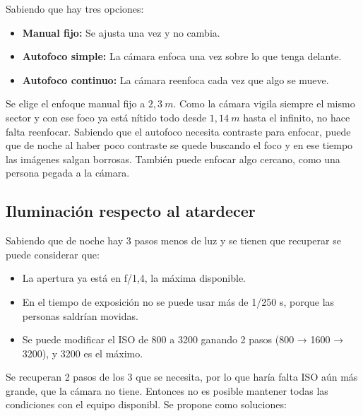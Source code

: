         Sabiendo que hay tres opciones:
        
        \begin{itemize}
            \item \textbf{Manual fijo:} Se ajusta una vez y no cambia.
            \item \textbf{Autofoco simple:} La cámara enfoca una vez sobre lo que tenga delante.
            \item \textbf{Autofoco continuo:} La cámara reenfoca cada vez que algo se mueve.
        \end{itemize}
        
        Se elige el enfoque manual fijo a $2{,}3\:m$. Como la cámara vigila siempre el mismo sector y con ese foco ya está nítido todo desde $1{,}14\:m$ hasta el infinito, no hace falta reenfocar. Sabiendo que el autofoco necesita contraste para enfocar, puede que de noche al haber poco contraste se quede buscando el foco y en ese tiempo las imágenes salgan borrosas. También puede enfocar algo cercano, como una persona pegada a la cámara.

    \subsection{Iluminación respecto al atardecer}

        Sabiendo que de noche hay 3 pasos menos de luz y se tienen que recuperar se puede considerar que:

        \begin{itemize}
            \item La apertura ya está en f/1,4, la máxima disponible.
            \item En el tiempo de exposición no se puede usar más de 1/250 s, porque las personas saldrían movidas.
            \item Se puede modificar el ISO de 800 a 3200 ganando 2 pasos (800 → 1600 → 3200), y 3200 es el máximo.
        \end{itemize}

        Se recuperan 2 pasos de los 3 que se necesita, por lo que haría falta ISO aún más grande, que la cámara no tiene. Entonces no es posible mantener todas las condiciones con el equipo disponibl. Se propone como soluciones:

